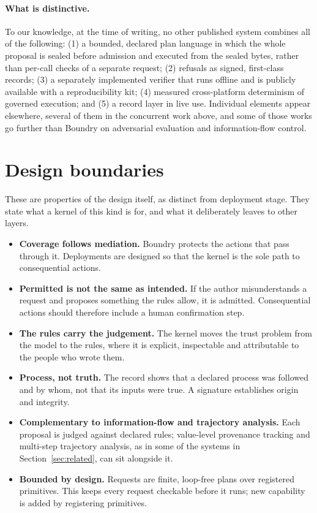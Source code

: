 \documentclass[11pt,a4paper]{article}
\begin{document}
\paragraph{What is distinctive.} To our knowledge, at the time of writing, no other published system combines all of the following: (1) a bounded, declared plan language in which the whole proposal is sealed before admission and executed from the sealed bytes, rather than per-call checks of a separate request; (2) refusals as signed, first-class records; (3) a separately implemented verifier that runs offline and is publicly available with a reproducibility kit; (4) measured cross-platform determinism of governed execution; and (5) a record layer in live use. Individual elements appear elsewhere, several of them in the concurrent work above, and some of those works go further than Boundry on adversarial evaluation and information-flow control.

\section{Design boundaries}\label{sec:limits}

These are properties of the design itself, as distinct from deployment stage. They state what a kernel of this kind is for, and what it deliberately leaves to other layers.

\begin{itemize}
  \item \textbf{Coverage follows mediation.} Boundry protects the actions that pass through it. Deployments are designed so that the kernel is the sole path to consequential actions.
  \item \textbf{Permitted is not the same as intended.} If the author misunderstands a request and proposes something the rules allow, it is admitted. Consequential actions should therefore include a human confirmation step.
  \item \textbf{The rules carry the judgement.} The kernel moves the trust problem from the model to the rules, where it is explicit, inspectable and attributable to the people who wrote them.
  \item \textbf{Process, not truth.} The record shows that a declared process was followed and by whom, not that its inputs were true. A signature establishes origin and integrity.
  \item \textbf{Complementary to information-flow and trajectory analysis.} Each proposal is judged against declared rules; value-level provenance tracking and multi-step trajectory analysis, as in some of the systems in Section~\ref{sec:related}, can sit alongside it.
  \item \textbf{Bounded by design.} Requests are finite, loop-free plans over registered primitives. This keeps every request checkable before it runs; new capability is added by registering primitives.
\end{itemize}
\end{document}
